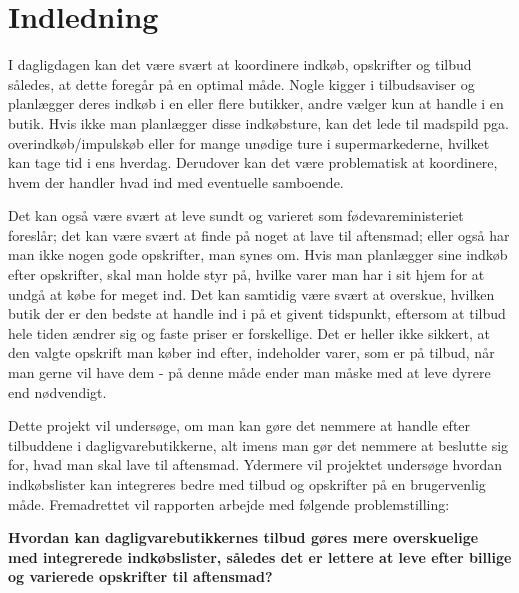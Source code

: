 \chapter{Indledning}\label{chapter:indledning}

I dagligdagen kan det være svært at koordinere indkøb, opskrifter og tilbud således, at dette foregår på en optimal måde. Nogle kigger i tilbudsaviser og planlægger deres indkøb i en eller flere butikker, andre vælger kun at handle i en butik. Hvis ikke man planlægger disse indkøbsture, kan det lede til madspild pga. overindkøb/impulskøb eller for mange unødige ture i supermarkederne, hvilket kan tage tid i ens hverdag. Derudover kan det være problematisk at koordinere, hvem der handler hvad ind med eventuelle samboende.  

Det kan også være svært at leve sundt og varieret som fødevareministeriet foreslår; det kan være svært at finde på noget at lave til aftensmad; eller også har man ikke nogen gode opskrifter, man synes om. 
Hvis man planlægger sine indkøb efter opskrifter, skal man holde styr på, hvilke varer man har i sit hjem for at undgå at købe for meget ind. Det kan samtidig være svært at overskue, hvilken butik der er den bedste at handle ind i på et givent tidspunkt, eftersom at tilbud hele tiden ændrer sig og faste priser er forskellige. Det er heller ikke sikkert, at den valgte opskrift man køber ind efter, indeholder varer, som er på tilbud, når man gerne vil have dem - på denne måde ender man måske med at leve dyrere end nødvendigt. 

Dette projekt vil undersøge, om man kan gøre det nemmere at handle efter tilbuddene i dagligvarebutikkerne, alt imens man gør det nemmere at beslutte sig for, hvad man skal lave til aftensmad. Ydermere vil projektet undersøge hvordan indkøbslister kan integreres bedre med tilbud og opskrifter på en brugervenlig måde.  Fremadrettet vil rapporten arbejde med følgende problemstilling:

\textbf{Hvordan kan dagligvarebutikkernes tilbud gøres mere overskuelige med integrerede indkøbslister, således det er lettere at leve efter billige og varierede opskrifter til aftensmad?}
